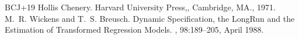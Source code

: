 \documentclass[letterpaper,10pt,english]{jupyterBook}
\begin{document}
\begin{sphinxthebibliography}{BCJ+19}
\sphinxAtStartPar
Hollis Chenery.  Harvard University Press,, Cambridge, MA., 1971.
\sphinxAtStartPar
M. R. Wickens and T. S. Breusch. Dynamic Specification, the Long\sphinxhyphen{}Run and the Estimation of Transformed Regression Models. , 98:189–205, April 1988.
\end{sphinxthebibliography}







\renewcommand{\indexname}{Index}
\printindex
\end{document}
